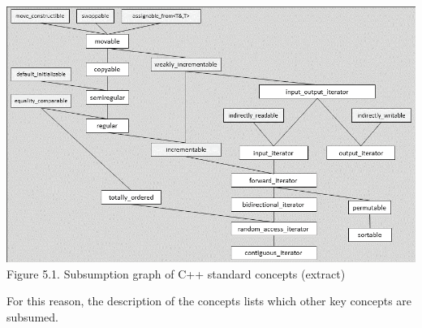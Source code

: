 \begin{center}
\includegraphics[width=1.\textwidth]{content/chapter5/images/1.png}\\
Figure 5.1. Subsumption graph of C++ standard concepts (extract)
\end{center}

For this reason, the description of the concepts lists which other key concepts are subsumed.



